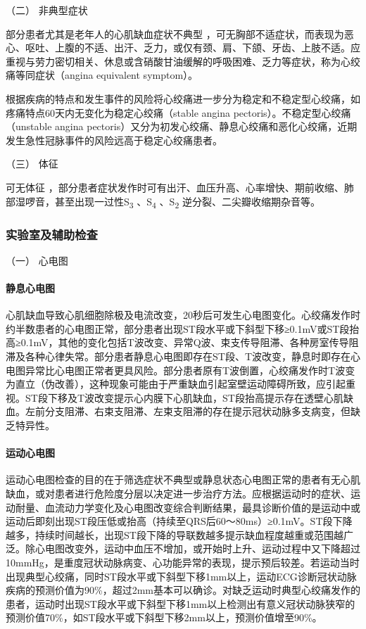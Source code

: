 \hypertarget{text00309.htmlux5cux23CHP10-7-2-1-2}{}
（二） 非典型症状

部分患者尤其是老年人的心肌缺血症状不典型
，可无胸部不适症状，而表现为恶心、呕吐、上腹的不适、出汗、乏力，或仅有颈、肩、下颌、牙齿、上肢不适。应重视与劳力密切相关、休息或含硝酸甘油缓解的呼吸困难、乏力等症状，称为心绞痛等同症状（angina
equivalent symptom）。

根据疾病的特点和发生事件的风险将心绞痛进一步分为稳定和不稳定型心绞痛，如疼痛特点60天内无变化为稳定心绞痛（stable
angina pectoris）。不稳定型心绞痛（unstable angina
pectoris）又分为初发心绞痛、静息心绞痛和恶化心绞痛，近期发生急性冠脉事件的风险远高于稳定心绞痛患者。

\hypertarget{text00309.htmlux5cux23CHP10-7-2-1-3}{}
（三） 体征

可无体征
，部分患者症状发作时可有出汗、血压升高、心率增快、期前收缩、肺部湿啰音，甚至出现一过性S\textsubscript{3}
、S\textsubscript{4} 、S\textsubscript{2} 逆分裂、二尖瓣收缩期杂音等。

\subsubsection{实验室及辅助检查}

\hypertarget{text00309.htmlux5cux23CHP10-7-2-2-1}{}
（一） 心电图

\paragraph{静息心电图}

心肌缺血导致心肌细胞除极及电流改变，20秒后可发生心电图变化。心绞痛发作时约半数患者的心电图正常，部分患者出现ST段水平或下斜型下移≥0.1mV或ST段抬高≥0.1mV，其他的变化包括T波改变、异常Q波、束支传导阻滞、各种房室传导阻滞及各种心律失常。部分患者静息心电图即存在ST段、T波改变，静息时即存在心电图异常比心电图正常者更具风险。部分患者原有T波倒置，心绞痛发作时T波变为直立（伪改善），这种现象可能由于严重缺血引起室壁运动障碍所致，应引起重视。ST段下移及T波改变提示心内膜下心肌缺血，ST段抬高提示存在透壁心肌缺血。左前分支阻滞、右束支阻滞、左束支阻滞的存在提示冠状动脉多支病变，但缺乏特异性。

\paragraph{运动心电图}

运动心电图检查的目的在于筛选症状不典型或静息状态心电图正常的患者有无心肌缺血，或对患者进行危险度分层以决定进一步治疗方法。应根据运动时的症状、运动耐量、血流动力学变化及心电图改变综合判断结果，最具诊断价值的是运动中或运动后即刻出现ST段压低或抬高（持续至QRS后60～80ms）≥0.1mV。ST段下降越多，持续时间越长，出现ST段下降的导联数越多提示缺血程度越重或范围越广泛。除心电图改变外，运动中血压不增加，或开始时上升、运动过程中又下降超过10mmHg，是重度冠状动脉病变、心功能异常的表现，提示预后较差。若运动当时出现典型心绞痛，同时ST段水平或下斜型下移1mm以上，运动ECG诊断冠状动脉疾病的预测价值为90\%，超过2mm基本可以确诊。对缺乏运动时典型心绞痛发作的患者，运动时出现ST段水平或下斜型下移1mm以上检测出有意义冠状动脉狭窄的预测价值70\%，如ST段水平或下斜型下移2mm以上，预测价值增至90\%。

